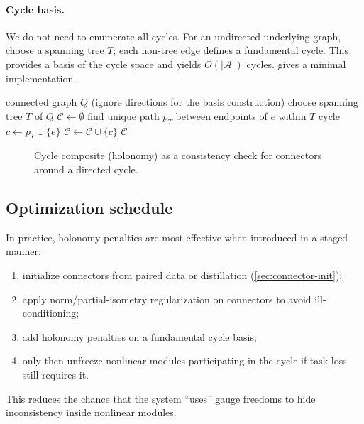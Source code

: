 \documentclass[11pt]{article}
\theoremstyle{definition}
\theoremstyle{plain}
\theoremstyle{remark}
\newcommand{\mc}[1]{\mathcal{#1}}
\newcommand{\Edges}{\mc{A}}
\begin{document}
\paragraph{Cycle basis.}
We do not need to enumerate all cycles.
For an undirected underlying graph, choose a spanning tree $T$; each non-tree edge defines a fundamental cycle.
This provides a basis of the cycle space and yields $O(|\Edges|)$ cycles.
 gives a minimal implementation.

\begin{algorithm}[t]
\caption{Fundamental cycle basis for holonomy penalties}
\label{alg:cycle-basis}
\begin{algorithmic}[1]
\Require connected graph $Q$ (ignore directions for the basis construction)
\State choose spanning tree $T$ of $Q$
\State $\mc{C}\gets \emptyset$
\For{edge $e\in\Edges\setminus T$}
  \State find unique path $p_T$ between endpoints of $e$ within $T$
  \State cycle $c\gets p_T \cup \{e\}$
  \State $\mc{C}\gets \mc{C}\cup\{c\}$
\EndFor
\State \Return $\mc{C}$
\end{algorithmic}
\end{algorithm}


\begin{figure}[t]
\centering
{}
\caption{Cycle composite (holonomy) as a consistency check for connectors around a directed cycle.}
\label{fig:holonomy}
\end{figure}

\subsection{Optimization schedule}
In practice, holonomy penalties are most effective when introduced in a staged manner:
\begin{enumerate}[leftmargin=2em]
\item initialize connectors from paired data or distillation (\cref{sec:connector-init});
\item apply norm/partial-isometry regularization on connectors to avoid ill-conditioning;
\item add holonomy penalties on a fundamental cycle basis;
\item only then unfreeze nonlinear modules participating in the cycle if task loss still requires it.
\end{enumerate}
This reduces the chance that the system ``uses'' gauge freedoms to hide inconsistency inside nonlinear modules.
\end{document}
